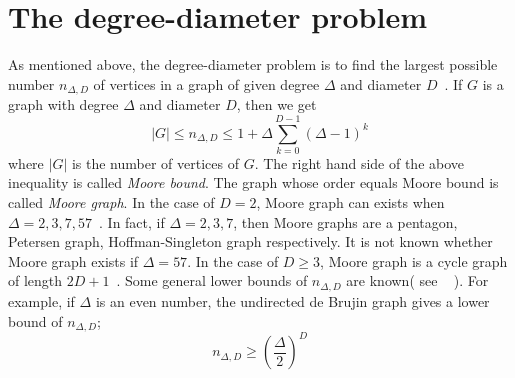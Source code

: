 \documentclass[conference]{IEEEtran}
\begin{document}
\section{The degree-diameter problem}
As mentioned above, the degree-diameter problem is to find
the largest possible number  $n_{\Delta,D}$ of vertices in a graph of given degree $\Delta$ and diameter $D$~\cite{MilSir2005}.
If $G$ is a graph with degree $\Delta$ and diameter $D$, then we get
\[ |G| \leq n_{\Delta,D} \leq 1 + \Delta \sum_{k=0}^{D-1} (\Delta - 1)^k\]
where $|G|$ is the number of vertices of $G$.
The right hand side of the above inequality is called {\it Moore bound}.
The graph whose order equals Moore bound is called {\it Moore graph}.
In the case of $D=2$, Moore graph can exists when $\Delta=2, 3, 7, 57$~\cite{hoffman1960moore}.
In fact, if $\Delta=2, 3, 7$, then Moore graphs are a pentagon, Petersen graph, Hoffman-Singleton graph respectively.
It is not known whether Moore graph exists if $\Delta=57$.
In the case of $D \geq 3$, Moore graph is a cycle graph of length $2D+1$~\cite{damerell1973moore}.
Some general lower bounds of $n_{\Delta, D}$ are known( see ~\cite{MilSir2005} ).
For example, if $\Delta$ is an even number, the undirected de Brujin graph gives a lower bound of $n_{\Delta, D}$;
\[ n_{\Delta, D} \geq {\left( \frac{\Delta}{2} \right)}^D \]
\end{document}

